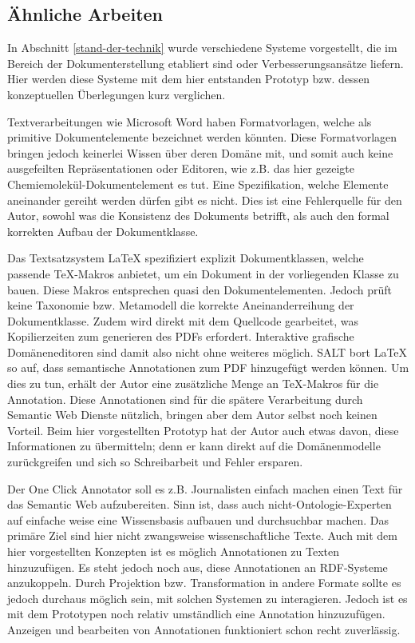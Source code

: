 \subsection{Ähnliche Arbeiten}\label{}
 
In Abschnitt \ref{stand-der-technik} wurde verschiedene Systeme vorgestellt, die im Bereich der Dokumenterstellung etabliert sind oder Verbesserungsansätze liefern. Hier werden diese Systeme mit dem hier entstanden Prototyp bzw. dessen konzeptuellen Überlegungen kurz verglichen.

 
Textverarbeitungen wie Microsoft Word haben Formatvorlagen, welche als primitive Dokumentelemente bezeichnet werden könnten. Diese Formatvorlagen bringen jedoch keinerlei Wissen über deren Domäne mit, und somit auch keine ausgefeilten Repräsentationen oder Editoren, wie z.B. das hier gezeigte Chemiemolekül-Dokumentelement es tut. Eine Spezifikation, welche Elemente aneinander gereiht werden dürfen gibt es nicht. Dies ist eine Fehlerquelle für den Autor, sowohl was die Konsistenz des Dokuments betrifft, als auch den formal korrekten Aufbau der Dokumentklasse.

 
Das Textsatzsystem LaTeX spezifiziert explizit Dokumentklassen, welche passende TeX-Makros anbietet, um ein Dokument in der vorliegenden Klasse zu bauen. Diese Makros entsprechen quasi den Dokumentelementen. Jedoch prüft keine Taxonomie bzw. Metamodell die korrekte Aneinanderreihung der Dokumentklasse. Zudem wird direkt mit dem Quellcode gearbeitet, was Kopilierzeiten zum generieren des PDFs erfordert. Interaktive grafische Domäneneditoren sind damit also nicht ohne weiteres möglich. SALT \citep{Groza} bort LaTeX so auf, dass semantische Annotationen zum PDF hinzugefügt werden können. Um dies zu tun, erhält der Autor eine zusätzliche Menge an TeX-Makros für die Annotation. Diese Annotationen sind für die spätere Verarbeitung durch Semantic Web Dienste nützlich, bringen aber dem Autor selbst noch keinen Vorteil. Beim hier vorgestellten Prototyp hat der Autor auch etwas davon, diese Informationen zu übermitteln; denn er kann direkt auf die Domänenmodelle zurückgreifen und sich so Schreibarbeit und Fehler ersparen.

 
Der One Click Annotator \citep{Heese} soll es z.B. Journalisten einfach machen einen Text für das Semantic Web aufzubereiten. Sinn ist, dass auch nicht-Ontologie-Experten auf einfache weise eine Wissensbasis aufbauen und durchsuchbar machen. Das primäre Ziel sind hier nicht zwangsweise wissenschaftliche Texte. Auch mit dem hier vorgestellten Konzepten ist es möglich Annotationen zu Texten hinzuzufügen. Es steht jedoch noch aus, diese Annotationen an RDF-Systeme anzukoppeln. Durch Projektion bzw. Transformation in andere Formate sollte es jedoch durchaus möglich sein, mit solchen Systemen zu interagieren. Jedoch ist es mit dem Prototypen noch relativ umständlich eine Annotation hinzuzufügen. Anzeigen und bearbeiten von Annotationen funktioniert schon recht zuverlässig.

